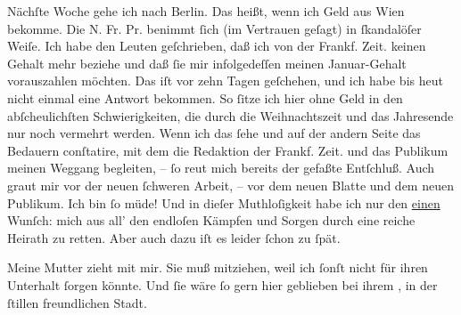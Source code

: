 \pstart
           Nächſte Woche gehe ich nach Berlin. Das heißt,
               wenn ich Geld aus Wien bekomme. Die N. Fr. Pr. benimmt ſich {\pb}(im
               Vertrauen geſagt) in ſkandalöſer Weiſe. Ich habe den Leuten geſchrieben, daß ich von der Frankf. Zeit. keinen Gehalt mehr beziehe und daß ſie mir
               infolgedeſſen meinen Januar-Gehalt vorauszahlen möchten.
               Das iſt vor zehn Tagen geſchehen, und ich habe bis heut nicht einmal eine Antwort bekommen. So ſitze ich hier ohne Geld in
               den abſcheulichſten Schwierigkeiten, die durch die Weihnachtszeit und das Jahresende
               nur noch vermehrt werden. Wenn ich das ſehe und auf der andern Seite das Bedauern
               conſtatire, mit dem die Redaktion der Frankf. Zeit. und das
               Publikum meinen Weggang begleiten, – ſo reut mich bereits der gefaßte Entſchluß. Auch
               graut mir vor der neuen ſchweren Arbeit, – vor dem neuen Blatte und dem neuen Publikum. Ich bin ſo
               müde! Und in dieſer Muthloſigkeit habe ich nur den \uline{einen} Wunſch: mich aus all’  den endloſen Kämpfen und Sorgen durch eine reiche Heirath zu retten. Aber auch
               dazu iſt es leider ſchon zu ſpät.\pend
           
\pstart
           Meine Mutter zieht mit mir.
               Sie muß mitziehen, weil ich ſonſt nicht für ihren Unterhalt ſorgen könnte. Und ſie
               wäre ſo gern hier geblieben bei ihrem \label{K_L02900-7v}\label{K_L02900-7}, in der ſtillen freundlichen Stadt.\pend
           
